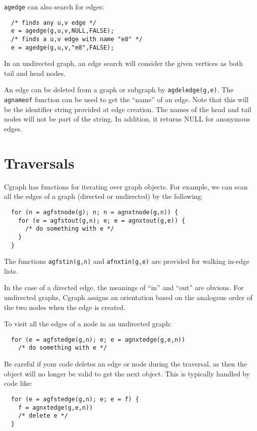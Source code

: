 \documentclass[11pt,letterpaper]{article}
\begin{document}
\verb"agedge" can also search for edges:

\begin{verbatim}
  /* finds any u,v edge */
  e = agedge(g,u,v,NULL,FALSE); 
  /* finds a u,v edge with name "e8" */
  e = agedge(g,u,v,"e8",FALSE); 
\end{verbatim}

In an undirected graph, an edge search will consider the given vertices
as both tail and head nodes.

An edge can be deleted from a graph or subgraph by \verb"agdeledge(g,e)".  
The \verb"agnameof" function can be used to get the ``name'' of an edge.
Note that this will be the identifier string provided at edge creation. 
The names
of the head and tail nodes will not be part of the string. In addition, it
returns NULL for anonymous edges.

\section{Traversals}
\label{sec:traversals}

Cgraph has functions for iterating over graph objects.
For example, we can scan all the edges of a graph (directed
or undirected) by the following:

\begin{verbatim}
  for (n = agfstnode(g); n; n = agnxtnode(g,n)) {
    for (e = agfstout(g,n); e; e = agnxtout(g,e)) {
      /* do something with e */
    }
  }
\end{verbatim}
\label{traversal}

The functions \verb"agfstin(g,n)" and \verb"afnxtin(g,e)" are
provided for walking in-edge lists.

In the case of a directed edge, the meanings of ``in'' and ``out'' are 
obvious.  For undirected graphs, Cgraph assigns an 
orientation based on the analogous order of the two nodes when the edge
is created.

To visit all the edges of a node in an undirected graph:

\begin{verbatim}
  for (e = agfstedge(g,n); e; e = agnxtedge(g,e,n))
    /* do something with e */
\end{verbatim}

Be careful if your code deletes an edge or node during the traversal, as
then the object will no longer be valid to get the next object. 
This is typically handled by code like:
\begin{verbatim}
  for (e = agfstedge(g,n); e; e = f) { 
    f = agnxtedge(g,e,n))
    /* delete e */
  }
\end{verbatim}
\end{document}
